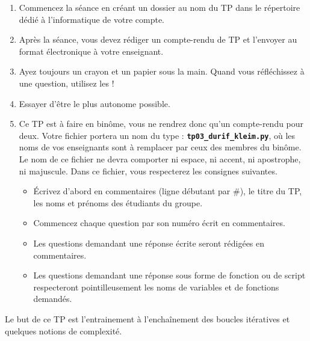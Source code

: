\begin{enumerate}
\item Commencez la séance en créant un dossier au nom du TP dans le répertoire dédié à l'informatique de votre compte. 
\item Après la séance, vous devez rédiger un compte-rendu de TP et
l'envoyer au format électronique à votre enseignant.
\item Ayez toujours un crayon et un papier sous la main. Quand vous réfléchissez à une question, utilisez les !
\item Essayer d'être le plus autonome possible. 
\item Ce TP est à faire en binôme, vous ne rendrez donc qu'un  compte-rendu pour deux.
Votre fichier portera un nom du type : \textbf{\texttt{tp03\_durif\_kleim.py}}, où les noms de vos enseignants sont à remplacer par ceux des membres du binôme. Le nom de ce 
fichier ne devra comporter ni espace, ni accent, ni apostrophe, ni majuscule.
Dans ce fichier, vous respecterez les consignes suivantes.
\begin{itemize}
  \item \'Ecrivez d'abord en commentaires (ligne débutant par \#), le titre du TP, les noms et prénoms des étudiants du groupe.
  \item Commencez chaque question par son numéro écrit en commentaires.
  \item Les questions demandant une réponse écrite seront rédigées en commentaires.
  \item Les questions demandant une réponse sous forme de fonction ou de script respecteront pointilleusement les noms de variables et de fonctions demandés.
\end{itemize}
\end{enumerate}

Le but de ce TP est l'entrainement à l'enchaînement des boucles itératives et quelques notions de complexité.

